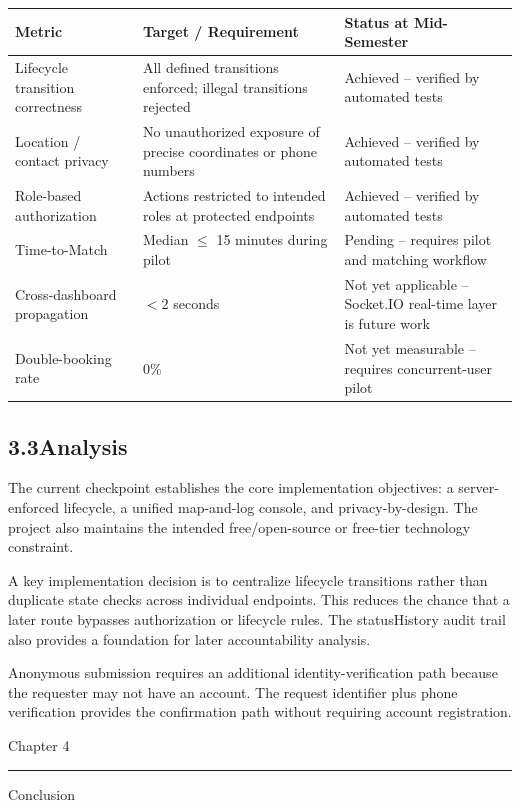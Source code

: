 \documentclass[11pt,a4paper]{article}
\newcommand{\chaptertitle}[2]{%
  \vspace*{0pt}%
  {\normalfont\fontsize{22}{25}\selectfont #1\par}%
  \vspace{2pt}%
  \noindent\rule{\textwidth}{0.7pt}\par
  \vspace{7pt}%
  {\normalfont\fontsize{22}{25}\selectfont #2\par}
  \vspace{5pt}%
}
\begin{document}
\renewcommand{\arraystretch}{1.35}
\begin{tabularx}{\textwidth}{@{}p{1.35in}p{2.15in}X@{}}
\toprule
\textbf{Metric} & \textbf{Target / Requirement} & \textbf{Status at Mid-Semester}\\
\midrule
Lifecycle transition correctness & All defined transitions enforced; illegal transitions rejected & Achieved -- verified by automated tests\\
Location / contact privacy & No unauthorized exposure of precise coordinates or phone numbers & Achieved -- verified by automated tests\\
Role-based authorization & Actions restricted to intended roles at protected endpoints & Achieved -- verified by automated tests\\
Time-to-Match & Median $\leq$ 15 minutes during pilot & Pending -- requires pilot and matching workflow\\
Cross-dashboard propagation & $<2$ seconds & Not yet applicable -- Socket.IO real-time layer is future work\\
Double-booking rate & 0\% & Not yet measurable -- requires concurrent-user pilot\\
\bottomrule
\end{tabularx}
\renewcommand{\arraystretch}{1}

\subsection{3.3\quad Analysis}

The current checkpoint establishes the core implementation objectives: a server-enforced lifecycle, a unified map-and-log console, and privacy-by-design. The project also maintains the intended free/open-source or free-tier technology constraint.

A key implementation decision is to centralize lifecycle transitions rather than duplicate state checks across individual endpoints. This reduces the chance that a later route bypasses authorization or lifecycle rules. The statusHistory audit trail also provides a foundation for later accountability analysis.

Anonymous submission requires an additional identity-verification path because the requester may not have an account. The request identifier plus phone verification provides the confirmation path without requiring account registration.

\newpage

\chaptertitle{Chapter 4}{Conclusion}
\end{document}
